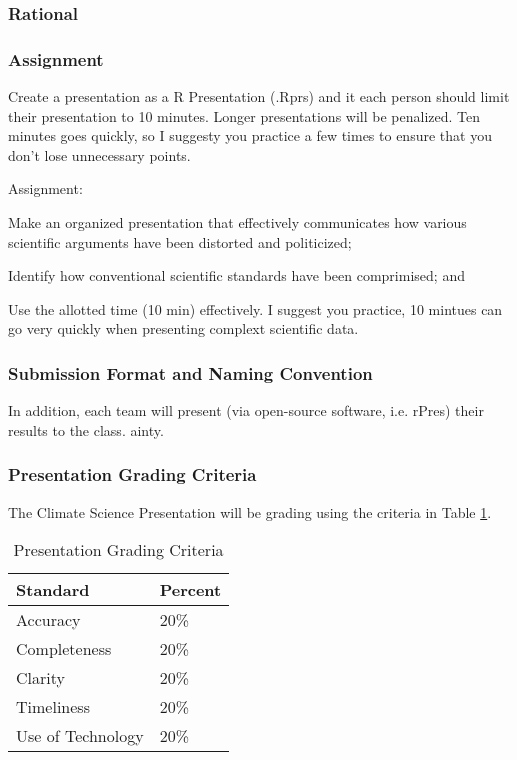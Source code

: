 
\subsubsection{Rational}

\subsubsection{Assignment}

Create a presentation as a R Presentation (.Rprs) and it each person should limit their presentation to 10 minutes. Longer presentations will be penalized. Ten minutes goes quickly, so I suggesty you practice a few times to ensure that you don't lose unnecessary points. 

\noindent Assignment: 
\begin{itemize*}
  \item Make an organized presentation that effectively communicates how various scientific arguments have been distorted and politicized;
  \item Identify how conventional scientific standards have been comprimised; and
  \item Use the allotted time (10 min) effectively. I suggest you practice, 10 mintues can go very quickly when presenting complext scientific data.
\end{itemize*}

\subsubsection{Submission Format and Naming Convention}

In addition, each team will present (via open-source software, i.e. rPres) their results to the class. 
ainty.

\subsubsection{Presentation Grading Criteria}

The Climate Science Presentation will be grading using the criteria in Table \ref{tab:presentationgrading}.

\begin{table}[h]
\centering
\caption{Presentation Grading Criteria}
\label{tab:presentationgrading}
\begin{tabular}{ll}\hline
Standard            & Percent \\ \hline\hline    
Accuracy            & 20\%  \\
Completeness        & 20\% \\
Clarity             & 20\% \\
Timeliness          & 20\% \\
Use of Technology   & 20\% \\ \hline
\end{tabular}
\end{table}